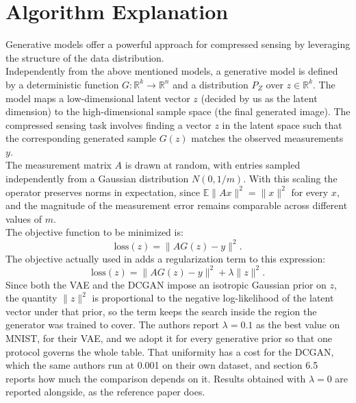 \section{Algorithm Explanation}
\vspace{1cm}
Generative models offer a powerful approach for compressed sensing by leveraging the structure of the data distribution.
\\
Independently from the above mentioned models, a generative model is defined by a deterministic function \( G: \mathbb{R}^k \to \mathbb{R}^n \) and a distribution \( P_Z \) over \( z \in \mathbb{R}^k \). The model maps a low-dimensional latent vector \( z \) (decided by us as the latent dimension) to the high-dimensional sample space (the final generated image). The compressed sensing task involves finding a vector \( z \) in the latent space such that the corresponding generated sample \( G(z) \) matches the observed measurements \( y \).
\\
The measurement matrix \( A \) is drawn at random, with entries sampled independently from a Gaussian distribution \( N(0, 1/m) \). With this scaling the operator preserves norms in expectation, since \( \mathbb{E}\|Ax\|^2 = \|x\|^2 \) for every \( x \), and the magnitude of the measurement error remains comparable across different values of \( m \).
\\
The objective function to be minimized is:\\
\begin{equation}
\text{loss}(z) = \| AG(z) - y \|^2.
\end{equation}
The objective actually used in \cite{bora2017} adds a regularization term to this expression:
\begin{equation}
\text{loss}(z) = \| AG(z) - y \|^2 + \lambda \|z\|^2 .
\end{equation}
Since both the VAE and the DCGAN impose an isotropic Gaussian prior on \( z \), the quantity \( \|z\|^2 \) is proportional to the negative log-likelihood of the latent vector under that prior, so the term keeps the search inside the region the generator was trained to cover. The authors report \( \lambda = 0.1 \) as the best value on MNIST, for their VAE, and we adopt it for every generative prior so that one protocol governs the whole table. That uniformity has a cost for the DCGAN, which the same authors run at 0.001 on their own dataset, and section 6.5 reports how much the comparison depends on it. Results obtained with \( \lambda = 0 \) are reported alongside, as the reference paper does.
\\
